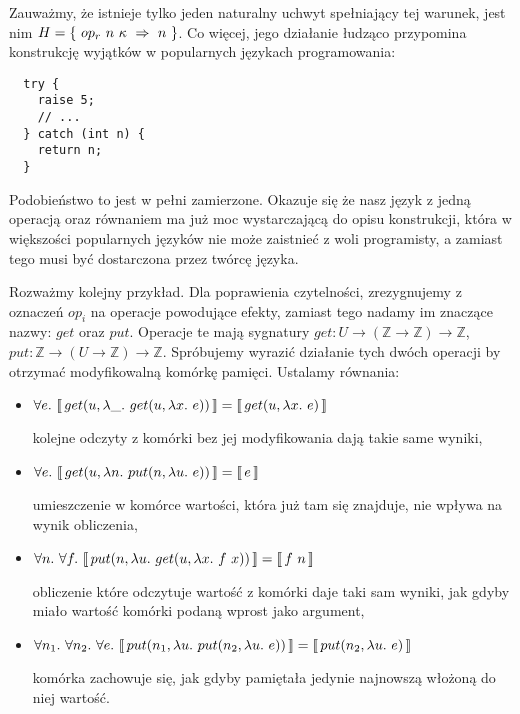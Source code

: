 Zauważmy, że istnieje tylko jeden naturalny uchwyt spełniający tej warunek, jest nim \(H = \{\ \hcase{op_r}{n\ \kappa}{n} \ \}\). Co więcej, jego działanie łudząco przypomina konstrukcję wyjątków w popularnych językach programowania:

\begin{lstlisting}
  try {
    raise 5;
    // ...
  } catch (int n) {
    return n;
  }
\end{lstlisting}

Podobieństwo to jest w pełni zamierzone. Okazuje się że nasz język z jedną operacją oraz równaniem ma już moc wystarczającą do opisu konstrukcji, która w większości popularnych języków nie może zaistnieć z woli programisty, a zamiast tego musi być dostarczona przez twórcę języka.

Rozważmy kolejny przykład. Dla poprawienia czytelności, zrezygnujemy z oznaczeń \(op_i\) na operacje powodujące efekty, zamiast tego nadamy im znaczące nazwy: \(get\) oraz \(put\). Operacje te mają sygnatury \(get: U \rightarrow (\mathbb{Z} \rightarrow \mathbb{Z}) \rightarrow \mathbb{Z}\), \(put: \mathbb{Z} \rightarrow (U \rightarrow \mathbb{Z}) \rightarrow \mathbb{Z}\). Spróbujemy wyrazić działanie tych dwóch operacji by otrzymać modyfikowalną komórkę pamięci. Ustalamy równania:

\begin{itemize}
\item \(\forall e.\ \llbracket\, get(u, \lambda \_.\ get(u, \lambda x.\ e))\, \rrbracket = \llbracket\, get(u, \lambda x.\ e)\, \rrbracket\)

  kolejne odczyty z komórki bez jej modyfikowania dają takie same wyniki,
\item \(\forall e.\ \llbracket\, get(u, \lambda n.\ put(n, \lambda u.\ e))\, \rrbracket = \llbracket\, e\, \rrbracket\)

  umieszczenie w komórce wartości, która już tam się znajduje, nie wpływa na wynik obliczenia,
\item \(\forall n.\ \forall f.\ \llbracket\, put(n, \lambda u.\ get(u, \lambda x.\ f\ x))\, \rrbracket = \llbracket\, f\ n\, \rrbracket\)

  obliczenie które odczytuje wartość z komórki daje taki sam wyniki, jak gdyby miało wartość komórki podaną wprost jako argument,
\item \(\forall n_1.\ \forall n_2.\ \forall e.\ \llbracket\, put(n_1, \lambda u.\ put(n_2, \lambda u.\ e))\, \rrbracket = \llbracket\, put(n_2, \lambda u.\ e)\, \rrbracket\)

  komórka zachowuje się, jak gdyby pamiętała jedynie najnowszą włożoną do niej wartość.
\end{itemize}

